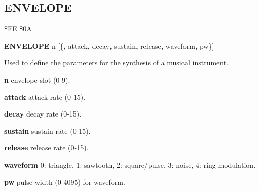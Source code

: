 
\newpage
\subsection{ENVELOPE}
\begin{description}[leftmargin=2cm,style=nextline]
\item [Token:] \$FE \$0A
\item [Format:] {\bf ENVELOPE} n [\{{\bf,} attack{\bf,} decay{\bf,}
		sustain{\bf,} release{\bf,} waveform{\bf,} pw\}]
\item [Usage:] Used to define
               the parameters for the synthesis of a musical
               instrument.

      {\bf n} envelope slot (0-9).

      {\bf attack} attack rate (0-15).

      {\bf decay} decay rate (0-15).

      {\bf sustain} sustain rate (0-15).

      {\bf release} release rate (0-15).

      {\bf waveform} 0: triangle, 1: sawtooth, 2: square/pulse, 3: noise, 4: ring modulation.

      {\bf pw} pulse width (0-4095) for waveform.


\end{description}

